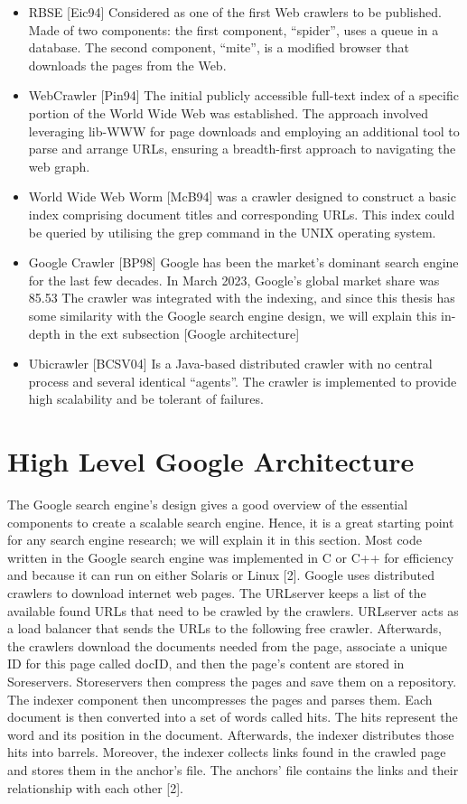\begin{itemize}
  \item RBSE [Eic94] Considered as one of the first Web crawlers to be published. Made of two components: the first component,
“spider”, uses a queue in a database. The second component, “mite”, is a modified browser that downloads the pages from the Web.
  \item WebCrawler [Pin94]  The initial publicly accessible full-text index of a specific portion of the World Wide Web was established. The approach involved leveraging lib-WWW for page downloads and employing an additional tool to parse and arrange URLs, ensuring a breadth-first approach to navigating the web graph.
  \item World Wide Web Worm [McB94] was a crawler designed to construct a basic index comprising document titles and corresponding URLs. This index could be queried by utilising the grep command in the UNIX operating system.
  \item Google Crawler [BP98] Google has been the market's dominant search engine for the last few decades. In March 2023, Google’s global market share was 85.53%
The crawler was integrated with the indexing, and since this thesis has some similarity with the Google search engine design, we will explain this in-depth in the ext subsection [Google architecture]
  \item Ubicrawler [BCSV04] Is a Java-based distributed crawler with no central process and several identical “agents”. The crawler is implemented to provide high scalability and be tolerant of failures.
\end{itemize}



\section{High Level Google Architecture}

The Google search engine's design gives a good overview of the essential components to create a scalable search engine. Hence, it is a great starting point for any search engine research; we will explain it in this section. Most code written in the Google search engine was implemented in C or C++ for efficiency and because it can run on either Solaris or Linux [2]. Google uses distributed crawlers to download internet web pages. The URLserver keeps a list of the available found URLs that need to be crawled by the crawlers. URLserver acts as a load balancer that sends the URLs to the following free crawler. Afterwards, the crawlers download the documents needed from the page, associate a unique ID for this page called docID, and then the page's content are stored in Soreservers. Storeservers then compress the pages and save them on a repository. The indexer component then uncompresses the pages and parses them. Each document is then converted into a set of words called hits. The hits represent the word and its position in the document. Afterwards, the indexer distributes those hits into barrels. Moreover, the indexer collects links found in the crawled page and stores them in the anchor's file. The anchors' file contains the links and their relationship with each other [2].


